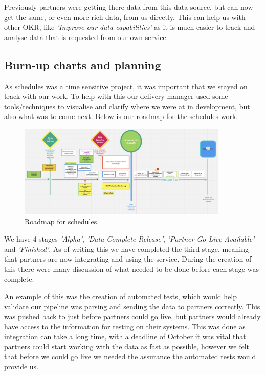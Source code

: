 
  Previously partners were getting there data from this data source, but can now get the same, or even more rich data, from us directly. This can 
  help us with other OKR, like \textit{'Improve our data capabilities'} as it is much easier to track and analyse data that is requested from our 
  own service.

  \subsection{Burn-up charts and planning}
  As schedules was a time sensitive project, it was important that we stayed on track with our work. To help with this our delivery manager 
  used some tools/techniques to visualise and clarify where we were at in development, but also what was to come next. Below is our roadmap
  for the schedules work.

  \begin{figure}[H]
    \centering
    \includegraphics[width=10cm]{assets/schedulesRoadmap.png}
    \caption{Roadmap for schedules.}
    \label{fig:schedulesRoadmap}
  \end{figure}

  We have 4 stages \textit{'Alpha'}, \textit{'Data Complete Release'}, \textit{'Partner Go Live Available'} and \textit{'Finished'}.
  As of writing this we have completed the third stage, meaning that partners are now integrating and using the service. During the 
  creation of this there were many discussion of what needed to be done before each stage was complete.

  An example of this was the creation of automated tests, which would help validate our pipeline was parsing and sending the data to partners correctly.
  This was pushed back to just before partners could go live, but partners would already have access to the information for testing 
  on their systems. This was done as integration can take a long time, with a deadline of October it was vital that partners could start
  working with the data as fast as possible, however we felt that before we could go live we needed the assurance the automated 
  tests would provide us.

